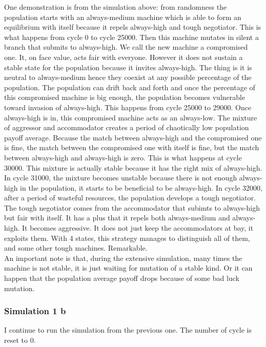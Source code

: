 \documentclass[12.5pt]{report}
\begin{document}
One demonstration is from the simulation above: from randomness the population starts with an always-medium machine which is able to form an equilibrium with itself because it repels always-high and tough negotiator. This is what happens from cycle 0 to cycle 25000. Then this machine mutates in silent a branch that submits to always-high. We call the new machine a compromised one. It, on face value, acts fair with everyone. However it does not sustain a stable state for the population because it invites always-high. The thing is it is neutral to always-medium hence they coexist at any possible percentage of the population. The population can drift back and forth and once the percentage of this compromised machine is big enough, the population becomes vulnerable toward invasion of always-high. This happens from cycle 25000 to 29000. Once always-high is in, this compromised machine acts as an always-low. The mixture of aggressor and accommodator creates a period of chaotically low population payoff average. Because the match between always-high and the compromised one is fine, the match between the compromised one with itself is fine, but the match between always-high and always-high is zero. This is what happens at cycle 30000. This mixture is actually stable because it has the right mix of always-high. In cycle 31000, the mixture becomes unstable because there is not enough always-high in the population, it starts to be beneficial to be always-high. In cycle 32000, after a period of wasteful resources, the population develops a tough negotiator. The tough negotiator comes from the accommodator that subimts to always-high but fair with itself. It has a plus that it repels both always-medium and always-high. It becomes aggressive. It does not just keep the accommodators at bay, it exploits them. With 4 states, this strategy manages to distinguish all of them, and some other tough machines. Remarkable.\\

An important note is that, during the extensive simulation, many times the machine is not stable, it is just waiting for mutation of a stable kind. Or it can happen that the population average payoff drops because of some bad luck mutation.\\


\subsubsection{Simulation 1 b}

I continue to run the simulation from the previous one. The number of cycle is reset to 0.
\end{document}
